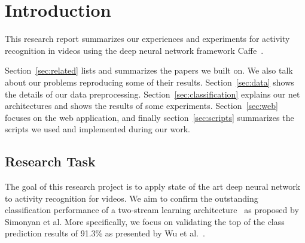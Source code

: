 \section{Introduction}
\label{sec:introduction}

This research report summarizes our experiences and experiments for activity recognition in videos using the deep neural network framework Caffe~\cite{jia2014caffe}.

Section~\ref{sec:related} lists and summarizes the papers we built on.
We also talk about our problems reproducing some of their results.
Section~\ref{sec:data} shows the details of our data preprocessing.
Section~\ref{sec:classification} explains our net architectures and shows the results of some experiments.
Section~\ref{sec:web} focuses on the web application, and finally section~\ref{sec:scripts} summarizes the scripts we used and implemented during our work.

\subsection{Research Task}
The goal of this research project is to apply state of the art deep neural network to activity recognition for videos. We aim to confirm the outstanding classification performance of a two-stream learning architecture~\cite{simonyan2014two} as proposed by Simonyan et al. More specifically, we focus on validating the top of the class prediction results of 91.3\% as presented by Wu et al.~\cite{wu2015modeling}.
